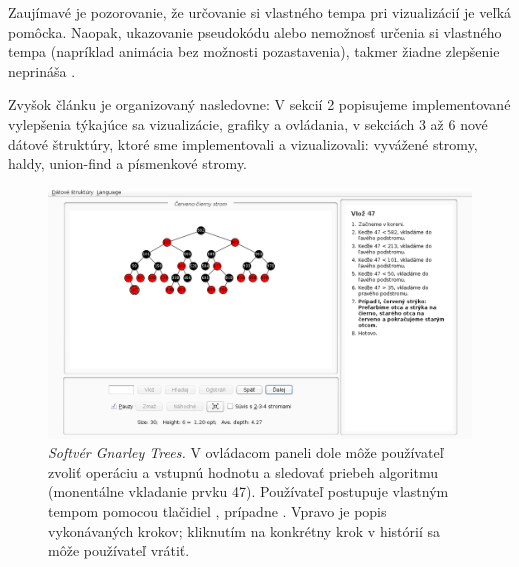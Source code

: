 Zaujímavé je pozorovanie, že určovanie si vlastného tempa pri vizualizácií 
je veľká pomôcka. Naopak, ukazovanie pseudokódu alebo nemožnosť určenia si
vlastného tempa (napríklad animácia bez možnosti pozastavenia), takmer 
žiadne zlepšenie neprináša \citep{shaffer,saraiya}.

Zvyšok článku je organizovaný nasledovne: V sekcií 2 popisujeme implementované
vylepšenia týkajúce sa vizualizácie, grafiky a ovládania, v sekciách 3 až 6
nové dátové štruktúry, ktoré sme implementovali a vizualizovali: vyvážené
stromy, haldy, union-find a písmenkové stromy.

\begin{figure}
\centering
\includegraphics[width=2.01\columnwidth]{obrazky/gt.png}
\caption{\emph{Softvér Gnarley Trees.} V ovládacom paneli dole môže používateľ
zvoliť operáciu a vstupnú hodnotu a sledovať priebeh algoritmu (monentálne vkladanie
prvku 47). Používateľ postupuje vlastným tempom  pomocou tlačidiel , prípadne
. Vpravo je popis vykonávaných krokov; kliknutím na konkrétny krok v histórií
sa môže používateľ vrátiť.}
\label{img:historia} 
\end{figure}
